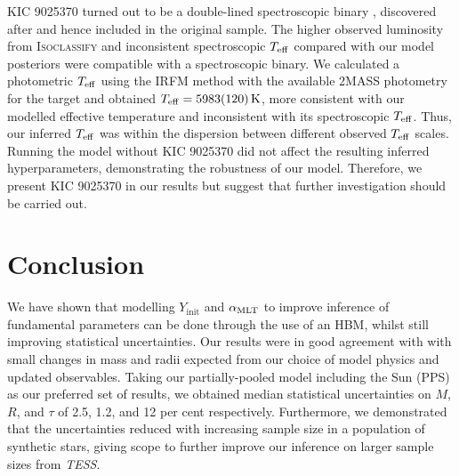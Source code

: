 KIC 9025370 turned out to be a double-lined spectroscopic binary \citep{Nissen.SilvaAguirre.ea2017}, discovered after  and hence included in the original sample. The higher observed luminosity from \textsc{Isoclassify} and inconsistent spectroscopic $\teff$ compared with our model posteriors were compatible with a spectroscopic binary. We calculated a photometric $\teff$ using the IRFM method \citep{Casagrande.Ramirez.ea2010} with the available 2MASS photometry for the target and obtained $\teff=\SI{5983(120)}{\kelvin}$, more consistent with our modelled effective temperature and inconsistent with its spectroscopic $\teff$. Thus, our inferred $\teff$ was within the dispersion between different observed $\teff$ scales. Running the model without KIC 9025370 did not affect the resulting inferred hyperparameters, demonstrating the robustness of our model. Therefore, we present KIC 9025370 in our results but suggest that further investigation should be carried out.

\section{Conclusion}



We have shown that modelling $Y_\mathrm{init}$ and $\mlt$ to improve inference of fundamental parameters can be done through the use of an HBM, whilst still improving statistical uncertainties. Our results were in good agreement with  with small changes in mass and radii expected from our choice of model physics and updated observables. Taking our partially-pooled model including the Sun (PPS) as our preferred set of results, we obtained median statistical uncertainties on $M$, $R$, and $\tau$ of 2.5, 1.2, and 12 per cent respectively. Furthermore, we demonstrated that the uncertainties reduced with increasing sample size in a population of synthetic stars, giving scope to further improve our inference on larger sample sizes from \emph{TESS}.

